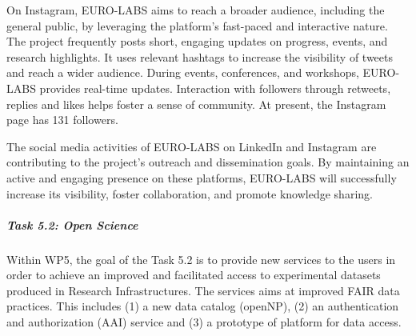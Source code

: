On Instagram, EURO-LABS aims to reach a broader audience, including the general public, by leveraging the platform's fast-paced and interactive nature. The project frequently posts short, engaging updates on progress, events, and research highlights. It uses relevant hashtags to increase the visibility of tweets and reach a wider audience. During events, conferences, and workshops, EURO-LABS provides real-time updates. Interaction with followers through retweets, replies and likes helps foster a sense of community. At present, the Instagram page has 131 followers. 

The social media activities of EURO-LABS on LinkedIn and Instagram are contributing to the project's outreach and dissemination goals. By maintaining an active and engaging presence on these platforms, EURO-LABS will successfully increase its visibility, foster collaboration, and promote knowledge sharing. 





\subparagraph{Task 5.2: Open Science } \mbox{}

Within WP5, the goal of the Task 5.2 is to provide new services to the users in order to achieve an improved and facilitated access to experimental datasets produced in Research Infrastructures. The services aims at improved FAIR data practices. This includes (1) a new data catalog (openNP), (2) an 
authentication and authorization (AAI) service and (3) a prototype of platform for data access.

